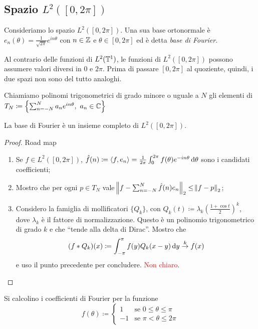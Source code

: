 \subsection{Spazio $ L^2([0, 2\pi]) $}
Consideriamo lo spazio $ L^2([0, 2\pi]) $.
Una sua base ortonormale è $ e_n(\theta) = \frac{1}{\sqrt{2\pi}}e^{i n \theta} $ con $ n \in \mathbb{Z} $ e $ \theta \in [0, 2\pi] $ ed è detta \emph{base di Fourier}.

\begin{oss}
    Al contrario delle funzioni di $ L^2(\mathbb{T}^1) $, le funzioni di $ L^2([0, 2\pi]) $ possono assumere valori diversi in $ 0 $ e $ 2\pi $. Prima di passare $ [0,2\pi] $ al quoziente, quindi, i due spazi non sono del tutto analoghi.
\end{oss}

\begin{definition}
    Chiamiamo polinomi trigonometrici di grado minore o uguale a $ N $ gli elementi di
    $ T_N \coloneqq \left\{\sum_{n = -N}^{N} a_n e^{i n \theta}, \ a_n \in \mathbb{C}\right\} $
\end{definition}

\begin{thm}
    La base di Fourier è un insieme completo di $ L^2([0,2\pi]) $.
\end{thm}
\begin{proof}
    Road map
    \begin{enumerate}
        \item Se $ f \in L^2([0, 2\pi]) $, $ \hat{f}(n) \coloneqq {\langle f, e_n \rangle} = \frac{1}{2\pi} \int_{0}^{2\pi} f(\theta) e^{-i n\theta} \dif{\theta} $ sono i candidati coefficienti;
        \item Mostro che per ogni $ p \in T_N $ vale $ \norm{f - \sum_{n = -N}^{N} \hat{f}(n) e_n}_2 \leq \norm{f - p}_2 $;
        \item Considero la famiglia di mollificatori $ \{Q_k\} $, con $ Q_k(t) \coloneqq \lambda_k (\frac{1 + \cos{t}}{2})^k $, dove $ \lambda_k $ è il fattore di normalizzazione. Questo è un polinomio trigonometrico di grado $ k $ e che ``tende alla delta di Dirac''. Mostro che
        \[
            (f * Q_k)(x) \coloneqq \int_{-\pi}^{\pi} f(y) Q_k(x - y) \dif{y} \overset{k}{\to} f(x)
        \]
        e uso il punto precedente per concludere. \textcolor{red}{Non chiaro}.
    \end{enumerate}
\end{proof}

\begin{exercise}
    Si calcolino i coefficienti di Fourier per la funzione
    \[
        f(\theta) \coloneqq
        \begin{cases}
            1  & \text{se } 0 \leq \theta \leq \pi \\
            -1 & \text{se } \pi < \theta \leq 2\pi
        \end{cases}
    \]
\end{exercise}
